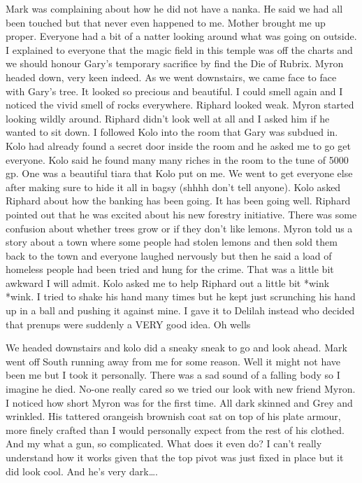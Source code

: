\begin{multicols}{2}
Mark was complaining about how he did not have a nanka. He said we had all been touched but that never even happened to me. Mother brought me up proper. Everyone had a bit of a natter looking around what was going on outside. I explained to everyone that the magic field in this temple was off the charts and we should honour Gary’s temporary sacrifice by find the Die of Rubrix. Myron headed down, very keen indeed. As we went downstairs, we came face to face with Gary’s tree. It looked so precious and beautiful. I could smell again and I noticed the vivid smell of rocks everywhere. Riphard looked weak. Myron started looking wildly around. Riphard didn’t look well at all and I asked him if he wanted to sit down. I followed Kolo into the room that Gary was subdued in. Kolo had already found a secret door inside the room and he asked me to go get everyone. Kolo said he found many many riches in the room to the tune of 5000 gp. One was a beautiful tiara that Kolo put on me. We went to get everyone else after making sure to hide it all in bagsy (shhhh don’t tell anyone). Kolo asked Riphard about how the banking has been going. It has been going well. Riphard pointed out that he was excited about his new forestry initiative. There was some confusion about whether trees grow or if they don’t like lemons. Myron told us a story about a town where some people had stolen lemons and then sold them back to the town and everyone laughed nervously but then he said a load of homeless people had been tried and hung for the crime. That was a little bit awkward I will admit. Kolo asked me to help Riphard out a little bit *wink *wink. I tried to shake his hand many times but he kept just scrunching his hand up in a ball and pushing it against mine. I gave it to Delilah instead who decided that prenups were suddenly a VERY good idea. Oh wells\medskip

We headed downstairs and kolo did a sneaky sneak to go and look ahead. Mark went off South running away from me for some reason. Well it might not have been me but I took it personally. There was a sad sound of a falling body so I imagine he died. No-one really cared so we tried our look with new friend Myron. I noticed how short Myron was for the first time. All dark skinned and Grey and wrinkled. His tattered orangeish brownish coat sat on top of his plate armour, more finely crafted than I would personally expect from the rest of his clothed. And my what a gun, so complicated. What does it even do? I can’t really understand how it works given that the top pivot was just fixed in place but it did look cool. And he’s very dark….\medskip


\end{multicols}
